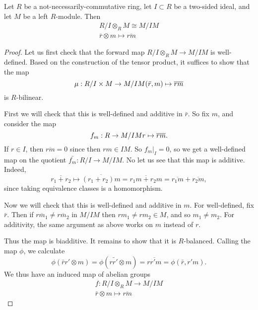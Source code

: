 \documentclass[12pt]{article}
\begin{document}
\begin{proposition}
	Let $R$ be a not-necessarily-commutative ring, let $I\subset R$ be a two-sided ideal, and let $M$ be a left $R$-module. Then 
	\begin{gather*}
		R/I \otimes_R M \cong M/IM \\
		\bar{r}\otimes m \mapsto \overline{rm}
	\end{gather*}
\end{proposition}
\begin{proof}
	Let us first check that the forward map $R/I\otimes_R M \to M/IM$ is well-defined. Based on the construction of the tensor product, it suffices to show that the map 
	\begin{equation*}
		\mu: R/I \times M \to M/IM \\
		(\bar{r},m) \mapsto \overline{rm}
	\end{equation*}
	is $R$-bilinear. 

	First we will check that this is well-defined and additive in $\bar{r}$. So fix $m$, and consider the map 
	\begin{equation*}
		f_m: R\to M/IM \\
		r \mapsto \overline{rm}.
	\end{equation*}
	If $r\in I$, then $\overline{rm} = 0$ since then $rm\in IM$. So $f_m|_I=0$, so we get a well-defined map on the quotient $\bar{f_m}:R/I \to M/IM$. No let us see that this map is additive. Indeed,
	\begin{equation*}
		\overline{r_1+r_2} \mapsto \overline{(r_1+r_2)m} = \overline{r_1m+r_2m} = \overline{r_1m} + \overline{r_2m},
	\end{equation*}
	since taking equivalence classes is a homomorphism.

	Now we will check that this is well-defined and additive in $m$. For well-defined, fix $\bar{r}$. Then if $\overline{rm_1}\neq\overline{rm_2}$ in $M/IM$ then $rm_1\neq rm_2\in M$, and so $m_1\neq m_2$. For additivity, the same argument as above works on $m$ instead of $r$.

	Thus the map is biadditive. It remains to show that it is $R$-balanced. Calling the map $\phi$, we calculate 
	\begin{equation*}
		\phi(\bar{r}r'\otimes m) = \phi(\bar{rr'}\otimes m) = \overline{rr'm} = \phi(\bar{r}, r'm).
	\end{equation*}
	We thus have an induced map of abelian groups 
	\begin{gather*}
		f: R/I \otimes_R M \to M/IM \\
		\bar{r}\otimes m \mapsto \overline{rm}
	\end{gather*}


\end{proof}
\end{document}
